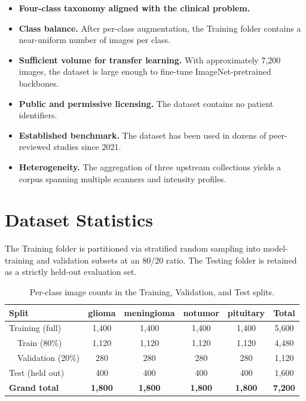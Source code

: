 \documentclass[12pt,a4paper,oneside]{report}
\begin{document}
\begin{itemize}[leftmargin=*]
  \item \textbf{Four-class taxonomy aligned with the clinical problem.}
  \item \textbf{Class balance.} After per-class augmentation, the Training folder contains a near-uniform number of images per class.
  \item \textbf{Sufficient volume for transfer learning.} With approximately 7,200 images, the dataset is large enough to fine-tune ImageNet-pretrained backbones.
  \item \textbf{Public and permissive licensing.} The dataset contains no patient identifiers.
  \item \textbf{Established benchmark.} The dataset has been used in dozens of peer-reviewed studies since 2021.
  \item \textbf{Heterogeneity.} The aggregation of three upstream collections yields a corpus spanning multiple scanners and intensity profiles.
\end{itemize}

\section{Dataset Statistics}

The Training folder is partitioned via stratified random sampling into model-training and validation subsets at an 80/20 ratio. The Testing folder is retained as a strictly held-out evaluation set.

\begin{table}[H]
  \centering
  \caption{Per-class image counts in the Training, Validation, and Test splits.}
  \label{tab:split-counts}
  \begin{tabular}{lccccc}
    \toprule
    \textbf{Split} & \textbf{glioma} & \textbf{meningioma} & \textbf{notumor} & \textbf{pituitary} & \textbf{Total} \\
    \midrule
    Training (full) & 1,400 & 1,400 & 1,400 & 1,400 & 5,600 \\
    ~~Train (80\%) & 1,120 & 1,120 & 1,120 & 1,120 & 4,480 \\
    ~~Validation (20\%) & 280 & 280 & 280 & 280 & 1,120 \\
    Test (held out) & 400 & 400 & 400 & 400 & 1,600 \\
    \textbf{Grand total} & \textbf{1,800} & \textbf{1,800} & \textbf{1,800} & \textbf{1,800} & \textbf{7,200} \\
    \bottomrule
  \end{tabular}
\end{table}
\end{document}
